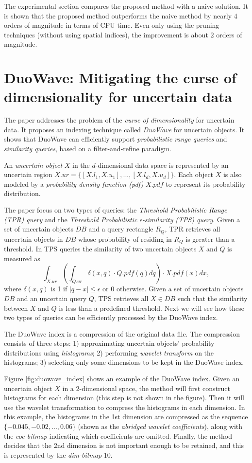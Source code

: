\documentclass[paper=a4, fontsize=18pt]{article} %
\numberwithin{equation}{section} %
\numberwithin{figure}{section} %
\numberwithin{table}{section} %
\begin{document}
The experimental section compares the proposed method with a naive solution. It is shown that the proposed method outperforms the naive method by nearly 4 orders of magnitude in terms of CPU time. Even only using the pruning techniques (without using spatial indices), the improvement is about 2 orders of magnitude.

\section{DuoWave: Mitigating the curse of dimensionality for uncertain data \cite{MZLC12}}

The paper addresses the problem of the \emph{curse of dimensionality} for uncertain data. It proposes an indexing technique called \emph{DuoWave} for uncertain objects. It shows that DuoWave can efficiently support \emph{probabilistic range queries} and \emph{similarity queries}, based on a filter-and-refine paradigm.

An \emph{uncertain object} $X$ in the $d$-dimensional data space is represented by an uncertain region $X.ur = \{[X.l_1, X.u_1],..., [X.l_d, X.u_d]\}$. Each object $X$ is also modeled by a \emph{probability density function (pdf)} $X.pdf$ to represent its probability distribution.

The paper focus on two types of queries: the \emph{Threshold Probabilistic Range (TPR) query} and the \emph{Threshold Probabilistic $\epsilon$-similarity (TPS) query}. Given a set of uncertain objects $DB$ and a query rectangle $R_Q$, TPR retrieves all uncertain objects in $DB$ whose probability of residing in $R_Q$ is greater than a threshold. In TPS queries the similarity of two uncertain objects $X$ and $Q$ is measured as
$$\int_{X.ur}(\int_{Q.ur} \delta(x,q)\cdot Q.pdf(q) dq) \cdot X.pdf(x) dx,$$
where $\delta(x,q)$ is 1 if $|q-x| \leq \epsilon$ or 0 otherwise. Given a set of uncertain objects $DB$ and an uncertain query $Q$, TPS retrieves all $X \in DB$ such that the similarity between $X$ and $Q$ is less than a predefined threshold. Next we will see how these two types of queries can be efficiently processed by the DuoWave index.

The DuoWave index is a compression of the original data file. The compression consists of three steps: 1) approximating uncertain objects' probability distributions using \emph{histograms}; 2) performing \emph{wavelet transform} on the histograms; 3) selecting only some dimensions to be kept in the DuoWave index.

Figure \ref{fig:duowave_index} shows an example of the DuoWave index. Given an uncertain object $X$ in a 2-dimensional space, the method will first construct histograms for each dimension (this step is not shown in the figure). Then it will use the wavelet transformation to compress the histograms in each dimension. In this example, the histograms in the 1st dimension are compressed as the sequence $\{-0.045, -0.02, ..., 0.06\}$ (shown as the \emph{abridged wavelet coefficients}), along with the \emph{coe-bitmap} indicating which coefficients are omitted. Finally, the method decides that the 2nd dimension is not important enough to be retained, and this is represented by the \emph{dim-bitmap} 10.
\end{document}
